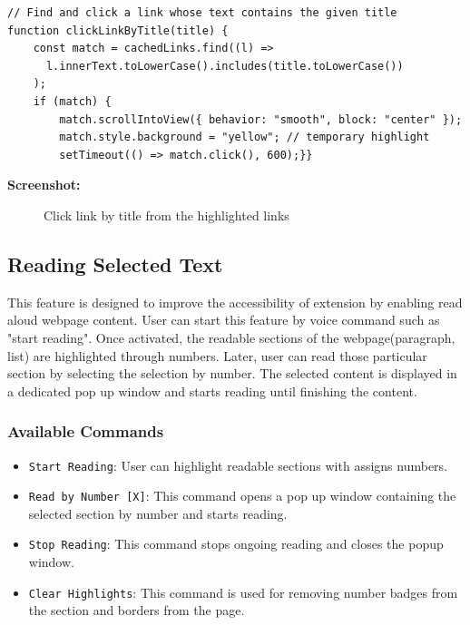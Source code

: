 \vspace{1in}

\begin{verbatim}
// Find and click a link whose text contains the given title
function clickLinkByTitle(title) {
    const match = cachedLinks.find((l) =>
      l.innerText.toLowerCase().includes(title.toLowerCase())
    );
    if (match) {
        match.scrollIntoView({ behavior: "smooth", block: "center" });
        match.style.background = "yellow"; // temporary highlight
        setTimeout(() => match.click(), 600);}}
\end{verbatim}


\textbf{Screenshot:}

\begin{figure}[htbp] 
    \centering
    \caption{Click link by title from the highlighted links}
    \label{fig:click_highlight_links}
\end{figure}


\subsection{Reading Selected Text}
This feature is designed to improve the accessibility of extension by enabling read aloud webpage content. User can start this feature by voice command such as "start reading". Once activated, the readable sections of the webpage(paragraph, list) are highlighted through numbers.
Later, user can read those particular section by selecting the selection by number. The selected content is displayed in a dedicated pop up window and starts reading until finishing the content.
\subsubsection*{Available Commands}
\begin{itemize}
    \item \texttt{Start Reading}: User can highlight readable sections with assigns numbers.  
    \item \texttt{Read by Number [X]}: This command opens a pop up window containing the selected section by number and starts reading.
    \item \texttt{Stop Reading}: This command stops ongoing reading and closes the popup window.  
    \item \texttt{Clear Highlights}: This command is used for removing number badges from the section and borders from the page.  
\end{itemize}

